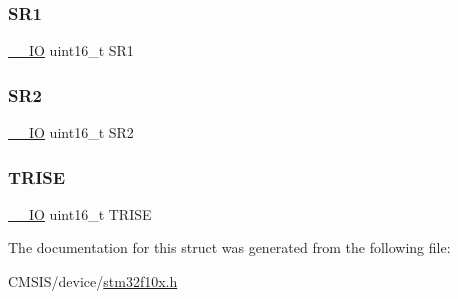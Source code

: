 \mbox{\label{struct_i2_c___type_def_a1e79a16729e8d1032d9fe552d50dce41}} 
\subsubsection{\texorpdfstring{SR1}{SR1}}
{\footnotesize\ttfamily \mbox{\hyperlink{core__sc300_8h_aec43007d9998a0a0e01faede4133d6be}{\+\_\+\+\_\+\+IO}} uint16\+\_\+t S\+R1}

\mbox{\label{struct_i2_c___type_def_a682809d3f8187cdefb9d615e89b67e65}} 
\subsubsection{\texorpdfstring{SR2}{SR2}}
{\footnotesize\ttfamily \mbox{\hyperlink{core__sc300_8h_aec43007d9998a0a0e01faede4133d6be}{\+\_\+\+\_\+\+IO}} uint16\+\_\+t S\+R2}

\mbox{\label{struct_i2_c___type_def_a7fbb70132ee565bb179078b6ee20cc2b}} 
\subsubsection{\texorpdfstring{TRISE}{TRISE}}
{\footnotesize\ttfamily \mbox{\hyperlink{core__sc300_8h_aec43007d9998a0a0e01faede4133d6be}{\+\_\+\+\_\+\+IO}} uint16\+\_\+t T\+R\+I\+SE}



The documentation for this struct was generated from the following file\+:\begin{DoxyCompactItemize}
\item 
C\+M\+S\+I\+S/device/\mbox{\hyperlink{stm32f10x_8h}{stm32f10x.\+h}}\end{DoxyCompactItemize}
